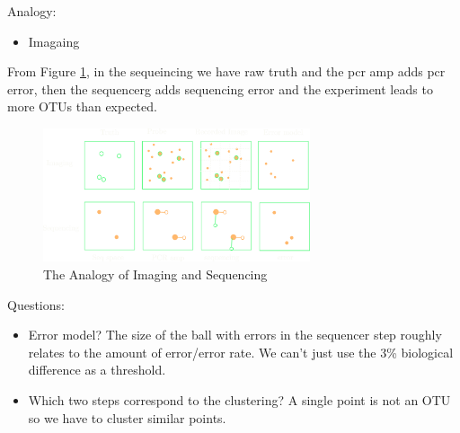 \documentclass[../main.tex]{subfiles}
\begin{document}
Analogy:
\begin{itemize}
    \item Imagaing 
\end{itemize}
From Figure \ref{fig:sequencing}, in the sequeincing we have raw truth and the pcr amp adds pcr error, then the
sequencerg adds sequencing error and the experiment leads to more OTUs than expected.
\begin{figure}[ht]
    \centering
    \includegraphics[width=0.7\textwidth]{im_seq.png}
    \caption{The Analogy of Imaging and Sequencing}
    \label{fig:sequencing}
\end{figure}
Questions:
\begin{itemize}
    \item Error model? The size of the ball with errors in the sequencer step roughly relates to the
    amount of error/error rate. We can't just use the 3\% biological difference as a threshold.
    \item Which two steps correspond to the clustering? A single point is not an OTU so we have to
    cluster similar points. 
\end{itemize}
\end{document}
